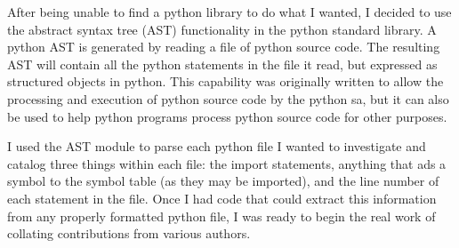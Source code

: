 \documentclass[a4paper,man,natbib,floatsintext]{apa6}
\begin{document}
  After being unable to find a \Gls{python} library to do what I wanted, I decided to use the abstract syntax tree (AST) functionality in the \Gls{python} standard library. A \Gls{python} AST is generated by reading a file of \Gls{python} source code. The resulting AST will contain all the \Gls{python} statements in the file it read, but expressed as structured objects in \Gls{python}. This capability was originally written to allow the processing and execution of \Gls{python} source code by the \Gls{python} \gls{sa}, but it can also be used to help \Gls{python} programs process \Gls{python} source code for other purposes.

  I used the AST module to parse each \Gls{python} file I wanted to investigate and catalog three things within each file: the import statements, anything that ads a symbol to the symbol table (as they may be imported), and the line number of each statement in the file. Once I had code that could extract this information from any properly formatted \Gls{python} file, I was ready to begin the real work of collating contributions from various authors.
\end{document}
